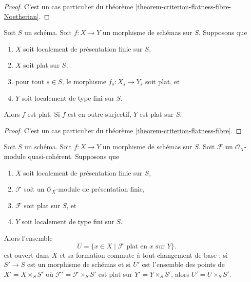 \begin{proof}
C'est un cas particulier du
théorème \ref{theorem-criterion-flatness-fibre-Noetherian}.
\end{proof}

\begin{lemma}
\label{lemma-morphism-between-flat}
Soit $S$ un schéma.
Soit $f : X \to Y$ un morphisme de schémas sur $S$.
Supposons que
\begin{enumerate}
\item $X$ soit localement de présentation finie sur $S$,
\item $X$ soit plat sur $S$,
\item pour tout $s \in S$, le morphisme
$f_s : X_s \to Y_s$ soit plat, et
\item $Y$ soit localement de type fini sur $S$.
\end{enumerate}
Alors $f$ est plat. Si $f$ est en outre surjectif, $Y$ est plat sur $S$.
\end{lemma}

\begin{proof}
C'est un cas particulier du
théorème \ref{theorem-criterion-flatness-fibre}.
\end{proof}

\begin{lemma}
\label{lemma-base-change-criterion-flatness-fibre}
Soit $S$ un schéma. Soit $f : X \to Y$ un morphisme de schémas sur $S$.
Soit $\mathcal{F}$ un $\mathcal{O}_X$-module quasi-cohérent.
Supposons que
\begin{enumerate}
\item $X$ soit localement de présentation finie sur $S$,
\item $\mathcal{F}$ soit un $\mathcal{O}_X$-module de présentation finie,
\item $\mathcal{F}$ soit plat sur $S$, et
\item $Y$ soit localement de type fini sur $S$.
\end{enumerate}
Alors l'ensemble
$$
U = \{x \in X \mid \mathcal{F} \text{ plat en }x \text{ sur }Y\}.
$$
est ouvert dans $X$ et sa formation commute à tout changement de base :
si $S' \to S$ est un morphisme de schémas et si $U'$ est l'ensemble des points
de $X' = X \times_S S'$ où $\mathcal{F}' = \mathcal{F} \times_S S'$
est plat sur $Y' = Y \times_S S'$, alors $U' = U \times_S S'$.
\end{lemma}

